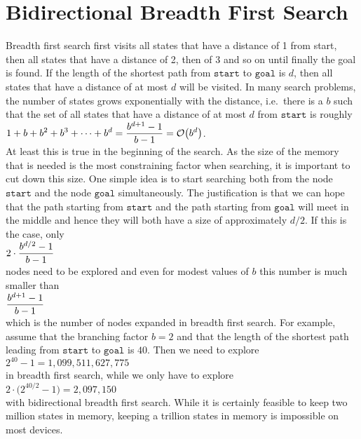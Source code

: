\section{Bidirectional Breadth First Search}
Breadth first search first visits all states that have a distance of 1 from start, then all
states that have a distance of 2, then of 3 and so on until finally the goal is found.  If the length of the shortest path
from $\mathtt{start}$ to $\mathtt{goal}$ is $d$, then all states that have a distance of at most $d$ will be
visited.  In many search problems, the number of states grows exponentially with the distance, i.e.~there is
a  $b$ such that the set of all states that have a distance of at most $d$
from $\mathtt{start}$ is roughly
\\[0.2cm]
\hspace*{1.3cm}
 $\displaystyle 1 + b + b^2 + b^3 + \cdots + b^d = \frac{b^{d+1} - 1}{b - 1} = \mathcal{O}\bigl(b^d\bigr)$. 
\\[0.2cm]
At least this is true in the beginning of the search.  As the size of
the memory that is needed is the most constraining factor when searching, it is important to cut down this
size.  One simple idea is to start searching both from the node $\mathtt{start}$ and the node $\mathtt{goal}$
simultaneously.  The justification is that we can hope that the path starting from $\mathtt{start}$ and the
path starting from $\mathtt{goal}$ will meet in the middle and hence they will both have a size of approximately
$d/2$.  If this is the case, only
\\[0.2cm]
\hspace*{1.3cm}
$\displaystyle 2 \cdot \frac{b^{d/2} - 1}{b - 1}$ 
\\[0.2cm]
nodes need to be explored and even for modest values of $b$ this number is much smaller than 
\\[0.2cm]
\hspace*{1.3cm}
$\displaystyle\frac{b^{d+1} - 1}{b - 1}$
\\[0.2cm]
which is the number of nodes expanded in breadth first search.  For example, assume that the branching factor
$b = 2$ and that the length of the shortest path leading from $\mathtt{start}$ to $\mathtt{goal}$
is $40$.  Then we need to explore
\\[0.2cm]
\hspace*{1.3cm}
$2^{40} - 1 = 1,099,511,627,775$
\\[0.2cm]
in breadth first search, while we only have to explore 
\\[0.2cm]
\hspace*{1.3cm}
$2 \cdot \bigl(2^{40/2} - 1\bigr) = 2,097,150$
\\[0.2cm]
with bidirectional breadth first search.  While it is certainly feasible to keep two million states in memory,
keeping a trillion states in memory is impossible on most devices.


